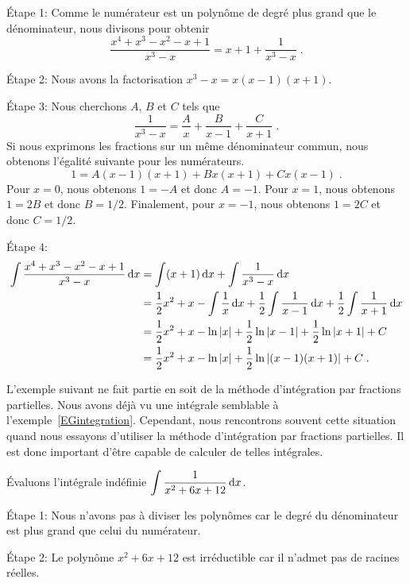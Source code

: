 {\begin{egg}
Étape 1: Comme le numérateur est un polynôme de degré plus grand que
le dénominateur, nous divisons pour obtenir
\[
\frac{x^4+x^3-x^2-x+1}{x^3-x} = x + 1 + \frac{1}{x^3-x} \; .
\]

Étape 2: Nous avons la factorisation $x^3-x = x(x-1)(x+1)$.

Étape 3: Nous cherchons $A$, $B$ et $C$ tels que
\[
\frac{1}{x^3-x} = \frac{A}{x} + \frac{B}{x-1} + \frac{C}{x+1} \; .
\]
Si nous exprimons les fractions sur un même dénominateur commun, nous
obtenons l'égalité suivante pour les numérateurs.
\[
1 = A(x-1)(x+1) + Bx(x+1) + Cx(x-1) \; .
\]
Pour $x=0$, nous obtenons $1=-A$ et donc $A=-1$.  Pour $x=1$, nous obtenons
$1 = 2B$ et donc $B = 1/2$.  Finalement, pour $x=-1$, nous obtenons
$1 = 2C$ et donc $C = 1/2$.

Étape 4:
\begin{align*}
\int \frac{x^4+x^3-x^2-x+1}{x^3-x}  \,\mathrm{d}x &=
\int (x + 1) \,\mathrm{d}x + \int \frac{1}{x^3-x} \,\mathrm{d}x \\
&= \frac{1}{2}x^2 + x - \int \frac{1}{x} \,\mathrm{d}x +
\frac{1}{2}\int \frac{1}{x-1} \,\mathrm{d}x
+ \frac{1}{2}\int \frac{1}{x+1} \,\mathrm{d}x \\
&= \frac{1}{2}x^2 + x - \ln|x| + \frac{1}{2}\ln|x-1|
+\frac{1}{2}\ln|x+1| + C \\
&= \frac{1}{2}x^2 + x - \ln|x| + \frac{1}{2}\ln|(x-1)(x+1)|+ C \; .
\end{align*}
\end{egg}

L'exemple suivant ne fait partie en soit de la méthode d'intégration
par fractions partielles.  Nous avons déjà vu une intégrale semblable à
l'exemple~\ref{EGintegration}.  Cependant, nous rencontrons souvent cette
situation quand nous essayons d'utiliser la méthode d'intégration par
fractions partielles.  Il est donc important d'être capable de
calculer de telles intégrales.

\begin{egg}
Évaluons l'intégrale indéfinie
$\displaystyle \int \frac{1}{x^2+6x+12}  \,\mathrm{d}x$.

Étape 1: Nous n'avons pas à diviser les polynômes car le degré du
dénominateur est plus grand que celui du numérateur.

Étape 2: Le polynôme $x^2+6x+12$ est irréductible car il n'admet pas
de racines réelles.


\end{egg}}
